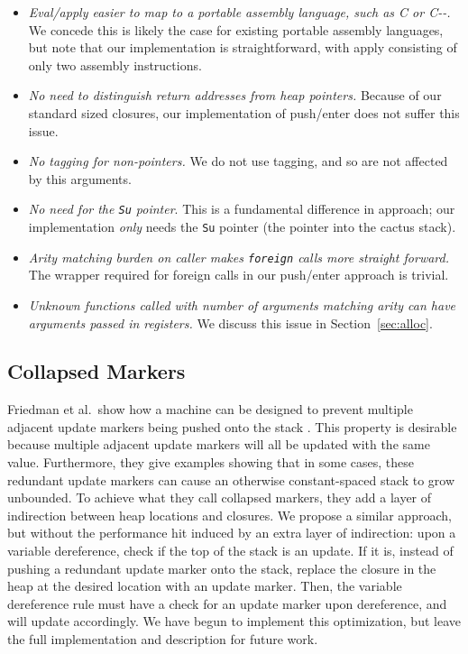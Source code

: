 \begin{itemize}
\item \emph{Eval/apply easier to map to a portable assembly language, such as C or
C{-}-.} We concede this is likely the case for existing portable assembly
languages, but note that our implementation is straightforward, with apply
consisting of only two assembly instructions.
\item \emph{No need to distinguish return addresses from heap pointers.} Because
of our standard sized closures, our implementation of push/enter does not suffer
this issue.
\item \emph{No tagging for non-pointers.} We do not use tagging, and so are not
affected by this arguments.
\item \emph{No need for the \texttt{Su} pointer}. This is a fundamental
difference in approach; our implementation \emph{only} needs the \texttt{Su}
pointer (the pointer into the cactus stack). 
\item \emph{Arity matching burden on caller makes \texttt{foreign} calls more
straight forward.} The wrapper required for foreign calls in our push/enter
approach is trivial.
\item \emph{Unknown functions called with number of arguments matching arity can
have arguments passed in registers.} We discuss this issue in
Section~\ref{sec:alloc}.  
\end{itemize}

\subsection{Collapsed Markers}
Friedman et al.\ show how a machine can be designed to prevent multiple adjacent
update markers being pushed onto the stack \cite{lkm}.  This property is
desirable because multiple adjacent update markers will all be updated with the
same value. Furthermore, they give examples showing that in some cases, these
redundant update markers can cause an otherwise constant-spaced stack to grow
unbounded. To achieve what they call collapsed markers, they add a layer
of indirection between heap locations and closures. We propose a similar
approach, but without the performance hit induced by an extra layer of
indirection: upon a variable dereference, check if the top of the stack is an
update. If it is, instead of pushing a redundant update marker onto the stack,
replace the closure in the heap at the desired location with an update marker.
Then, the variable dereference rule must have a check for an update marker upon
dereference, and will update accordingly. We have begun to implement this
optimization, but leave the full implementation and description for future work.

